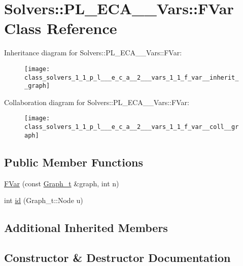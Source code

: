 \hypertarget{class_solvers_1_1_p_l___e_c_a__2___vars_1_1_f_var}{}\section{Solvers\+:\+:P\+L\+\_\+\+E\+C\+A\+\_\+\_\+\+Vars\+:\+:F\+Var Class Reference}
\label{class_solvers_1_1_p_l___e_c_a__2___vars_1_1_f_var}


Inheritance diagram for Solvers\+:\+:P\+L\+\_\+\+E\+C\+A\+\_\+\_\+\+Vars\+:\+:F\+Var\+:\nopagebreak
\begin{figure}[H]
\begin{center}
\leavevmode
\texttt{[image: class\_solvers\_1\_1\_p\_l\_\_\_e\_c\_a\_\_2\_\_\_vars\_1\_1\_f\_var\_\_inherit\_\_graph]}
\end{center}
\end{figure}


Collaboration diagram for Solvers\+:\+:P\+L\+\_\+\+E\+C\+A\+\_\+\_\+\+Vars\+:\+:F\+Var\+:\nopagebreak
\begin{figure}[H]
\begin{center}
\leavevmode
\texttt{[image: class\_solvers\_1\_1\_p\_l\_\_\_e\_c\_a\_\_2\_\_\_vars\_1\_1\_f\_var\_\_coll\_\_graph]}
\end{center}
\end{figure}
\subsection*{Public Member Functions}
\begin{DoxyCompactItemize}
\item 
\hyperlink{class_solvers_1_1_p_l___e_c_a__2___vars_1_1_f_var_a7ee1990a04e40785a54626cc41417573}{F\+Var} (const \hyperlink{pl__reff_8cpp_a65aea14f39d53b24df9910d54216d620}{Graph\+\_\+t} \&graph, int n)
\item 
int \hyperlink{class_solvers_1_1_p_l___e_c_a__2___vars_1_1_f_var_a3e092894e61d1d3a09431d021a3d2cde}{id} (Graph\+\_\+t\+::\+Node u)
\end{DoxyCompactItemize}
\subsection*{Additional Inherited Members}


\subsection{Constructor \& Destructor Documentation}
\mbox{\label{class_solvers_1_1_p_l___e_c_a__2___vars_1_1_f_var_a7ee1990a04e40785a54626cc41417573}} 
